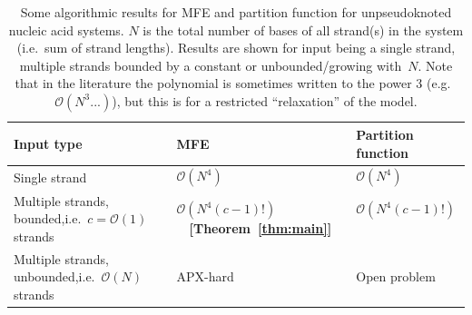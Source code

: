\begin{table}[t]
	\centering
	\begin{tabular}{ p{5cm}||p{5cm}|p{5cm}  }
		
		Input type& MFE & Partition function\\ 
		
		\hline\hline
		
		Single strand   &   $\mathcal{O}(N^4)$ \ \   \cite{zukeroptimal,zukerrna, nussinov1978algorithms, nussinov1980fast,waterman1986rapid}  &   $\mathcal{O}(N^4)$ \ \  \cite{mccaskill1990equilibrium}     \\  \hline
		Multiple strands, bounded,\newline i.e.~$c= \mathcal{O}(1)$ strands &  $\mathcal{O}(N^4 (c-1)!)$ \ \  {\bf [Theorem~\ref{thm:main}]}   &   $\mathcal{O}(N^4 (c-1)!)$  \ \ \  \cite{dirks2007thermodynamic}\footref{ft:N3}    \\ \hline
		Multiple strands, unbounded,\newline i.e.~$\mathcal{O}(N)$ strands &  APX-hard \ \   \cite{condon2021predicting}  &  Open problem   \\ \hline
	\end{tabular}\vspace{-1.5ex}
	\caption{\label{table}\small
		Some algorithmic results for MFE and partition function for unpseudoknoted nucleic acid systems.
		$N$ is the total number of bases of all strand(s) in the system (i.e.~sum of strand lengths).
		Results are shown for input being a single strand, 
		multiple strands bounded by a constant or unbounded/growing with~$N$. 
		Note that in the literature the polynomial is sometimes written to the power 3 (e.g.~$\mathcal{O}(N^3 ...)$), but this is for a restricted ``relaxation'' of the model.  
	}
\end{table}

